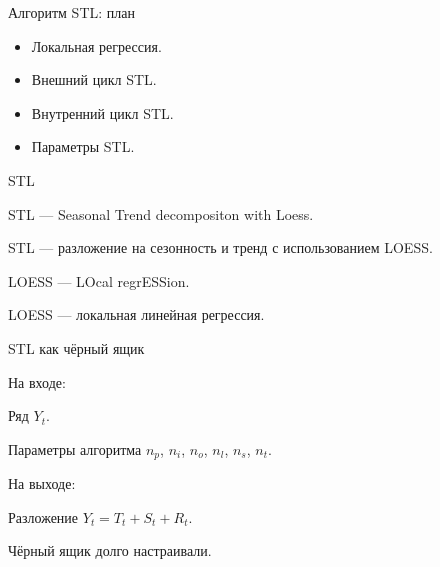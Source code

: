 
\begin{frame} %


\end{frame}



\begin{frame}{Алгоритм STL: план}
  \begin{itemize}[<+->]
    \item Локальная регрессия.
    \item Внешний цикл STL.
    \item Внутренний цикл STL.
    \item Параметры STL.
  \end{itemize}

\end{frame}


\begin{frame}{STL}

  \alert{STL} — Seasonal Trend decompositon with Loess.
  
  STL — разложение на сезонность и тренд с использованием LOESS.
  
  \pause
  
  \alert{LOESS} — LOcal regrESSion.
  
  LOESS — локальная линейная регрессия. 
  
\end{frame}


\begin{frame}{STL как чёрный ящик}

\alert{На входе:}

Ряд $Y_t$.

Параметры алгоритма $n_p$, $n_i$, $n_o$, $n_l$, $n_s$, $n_t$.

\pause
\alert{На выходе:}

Разложение $Y_t = T_t + S_t + R_t$.

\pause

Чёрный ящик \alert{долго} настраивали. 

\end{frame}


